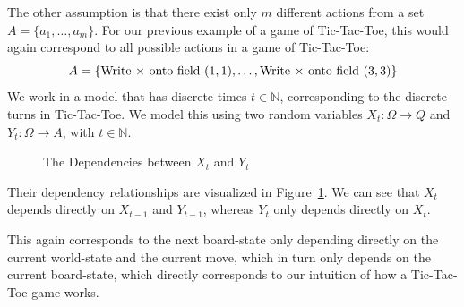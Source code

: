 \documentclass{article}
\theoremstyle{definition}
\def\ticX{\text{${\times}$}}
\begin{document}
The other assumption is that there exist only $m$ different actions from a set $A=\{a_1,\ldots,a_m\}$. For our previous example of a game of Tic-Tac-Toe, this would again correspond to all possible actions in a game of Tic-Tac-Toe:
\[
A=\left \{\text{Write {\ticX} onto field $(1,1)$}, \ldots,\text{Write {\ticX} onto field $(3,3)$} \right \}
\]
We work in a model that has discrete times $t\in \mathbb{N}$, corresponding to the discrete turns in Tic-Tac-Toe. 
We model this using two random variables $X_t:\Omega \rightarrow Q$ and $Y_t:\Omega \rightarrow A$, with $t\in \mathbb{N}$. 
\begin{figure}\centering
{}
\caption{The Dependencies between $X_t$ and $Y_t$}
\label{Mardep}
\end{figure}
Their dependency relationships are visualized in Figure~\ref{Mardep}. We can see that $X_t$ depends directly on $X_{t-1}$ and $Y_{t-1}$, whereas $Y_t$ only depends directly on $X_t$.  

This again corresponds to the next board-state only depending directly on the current world-state and the current move, which in turn only depends on the current board-state, which directly corresponds to our intuition of how a Tic-Tac-Toe game works. 

\end{document}
